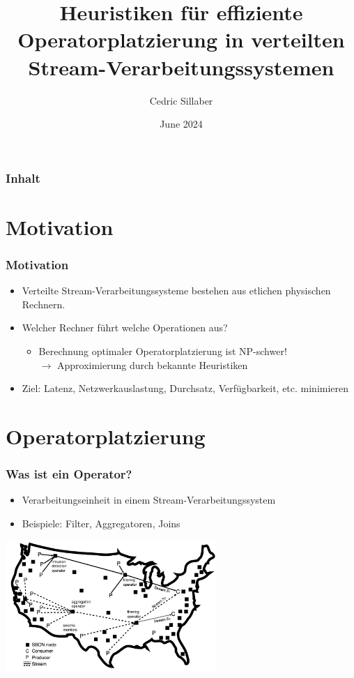 \documentclass{beamer}
\title{Heuristiken für effiziente Operatorplatzierung in verteilten Stream-Verarbeitungssystemen}
\author{Cedric Sillaber}
\date{June 2024}
\begin{document}
\frame{\titlepage}

\begin{frame}
\frametitle{Inhalt}
\tableofcontents
\end{frame}


\section{Motivation}
\begin{frame}
\frametitle{Motivation}
\begin{itemize}
    \item Verteilte Stream-Verarbeitungssysteme bestehen aus etlichen physischen Rechnern.
    \item Welcher Rechner führt welche Operationen aus?
    \begin{itemize}
        \item Berechnung optimaler Operatorplatzierung ist NP-schwer! \\
        $\rightarrow$ Approximierung durch bekannte Heuristiken
    \end{itemize}
    \item Ziel: Latenz, Netzwerkauslastung, Durchsatz, Verfügbarkeit, etc. minimieren
\end{itemize}
\end{frame}

\section{Operatorplatzierung}
\begin{frame}
\frametitle{Was ist ein Operator?}
\begin{itemize}
    \item Verarbeitungseinheit in einem Stream-Verarbeitungssystem
    \item Beispiele: Filter, Aggregatoren, Joins
\end{itemize}
\begin{center}
    \includegraphics[width=0.6\textwidth]{res/SVS.png}
\end{center}
\end{frame}
\end{document}
